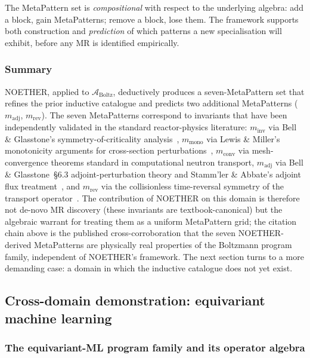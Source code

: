 \documentclass[manuscript]{acmart}
\begin{document}
The MetaPattern set is \emph{compositional} with respect to the underlying algebra: add a block, gain MetaPatterns; remove a block, lose them. The framework supports both construction and \emph{prediction} of which patterns a new specialisation will exhibit, before any MR is identified empirically.

\subsubsection{Summary}

NOETHER, applied to $\mathcal{A}_{\mathrm{Boltz}}$, deductively produces a seven-MetaPattern set that refines the prior inductive catalogue and predicts two additional MetaPatterns ($m_{\mathrm{adj}}$, $m_{\mathrm{rev}}$). The seven MetaPatterns correspond to invariants that have been independently validated in the standard reactor-physics literature: $m_{\mathrm{inv}}$ via Bell \& Glasstone's symmetry-of-criticality analysis~\cite{BellGlasstone1970}, $m_{\mathrm{mono}}$ via Lewis \& Miller's monotonicity arguments for cross-section perturbations~\cite{LewisMiller1993}, $m_{\mathrm{conv}}$ via mesh-convergence theorems standard in computational neutron transport, $m_{\mathrm{adj}}$ via Bell \& Glasstone~\S6.3 adjoint-perturbation theory and Stamm'ler \& Abbate's adjoint flux treatment~\cite{StammlerAbbate1983}, and $m_{\mathrm{rev}}$ via the collisionless time-reversal symmetry of the transport operator~\cite{LewisMiller1993}. The contribution of NOETHER on this domain is therefore not de-novo MR discovery (these invariants are textbook-canonical) but the algebraic warrant for treating them as a uniform MetaPattern grid; the citation chain above is the published cross-corroboration that the seven NOETHER-derived MetaPatterns are physically real properties of the Boltzmann program family, independent of NOETHER's framework. The next section turns to a more demanding case: a domain in which the inductive catalogue does not yet exist.

\subsection{Cross-domain demonstration: equivariant machine learning}
\label{sec:cross-domain}

\subsubsection{The equivariant-ML program family and its operator algebra}
\end{document}
